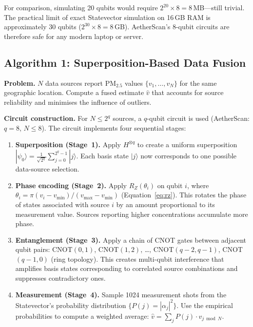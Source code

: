 \documentclass[12pt,a4paper]{article}
\newcommand{\ket}[1]{|#1\rangle}
\begin{document}
For comparison, simulating 20 qubits would require
$2^{20} \times 8 = 8$\,MB---still trivial. The practical limit of exact
Statevector simulation on 16\,GB RAM is approximately 30 qubits
($2^{30} \times 8 = 8$\,GB). AetherScan's 8-qubit circuits are therefore
safe for any modern laptop or server.

\subsection{Algorithm 1: Superposition-Based Data Fusion}
\label{sec:quantum:superpos}

\noindent\textbf{Problem.} $N$ data sources report $\text{PM}_{2.5}$
values $\{v_1, \ldots, v_N\}$ for the same geographic location. Compute a
fused estimate $\hat{v}$ that accounts for source reliability and minimises
the influence of outliers.

\noindent\textbf{Circuit construction.}
For $N \leq 2^q$ sources, a $q$-qubit circuit is used (AetherScan: $q = 8$,
$N \leq 8$). The circuit implements four sequential stages:

\begin{enumerate}
\item \textbf{Superposition (Stage~1).}
      Apply $H^{\otimes q}$ to create a uniform superposition
      $\ket{\psi_0} = \frac{1}{\sqrt{2^q}}\sum_{j=0}^{2^q-1}\ket{j}$.
      Each basis state $\ket{j}$ now corresponds to one possible data-source
      selection.

\item \textbf{Phase encoding (Stage~2).}
      Apply $R_Z(\theta_i)$ on qubit $i$, where
      $\theta_i = \pi (v_i - v_{\min})/(v_{\max} - v_{\min})$
      (Equation~\ref{eq:rz}). This rotates the phase of states associated
      with source $i$ by an amount proportional to its measurement value.
      Sources reporting higher concentrations accumulate more phase.

\item \textbf{Entanglement (Stage~3).}
      Apply a chain of CNOT gates between adjacent qubit pairs:
      CNOT$(0,1)$, CNOT$(1,2)$, \ldots, CNOT$(q-2, q-1)$,
      CNOT$(q-1, 0)$ (ring topology). This creates multi-qubit interference
      that amplifies basis states corresponding to correlated source
      combinations and suppresses contradictory ones.

\item \textbf{Measurement (Stage~4).}
      Sample 1024 measurement shots from the Statevector's probability
      distribution $\{P(j) = |\alpha_j|^2\}$. Use the empirical probabilities
      to compute a weighted average:
      $\hat{v} = \sum_j P(j) \cdot v_{j \bmod N}$.
\end{enumerate}
\end{document}
